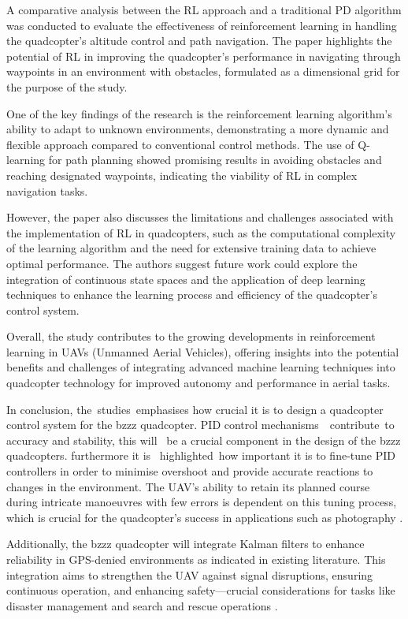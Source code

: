 \documentclass{report}
\begin{document}
A comparative analysis between the RL approach and a traditional PD algorithm
was conducted to evaluate the effectiveness of reinforcement learning in
handling the quadcopter's altitude control and path navigation. The paper
highlights the potential of RL in improving the quadcopter's performance in
navigating through waypoints in an environment with obstacles, formulated as a
dimensional grid for the purpose of the study.

One of the key findings of the research is the reinforcement learning
algorithm's ability to adapt to unknown environments, demonstrating a more
dynamic and flexible approach compared to conventional control methods. The use
of Q-learning for path planning showed promising results in avoiding obstacles
and reaching designated waypoints, indicating the viability of RL in complex
navigation tasks.

However, the paper also discusses the limitations and challenges associated with
the implementation of RL in quadcopters, such as the computational complexity of
the learning algorithm and the need for extensive training data to achieve
optimal performance. The authors suggest future work could explore the
integration of continuous state spaces and the application of deep learning
techniques to enhance the learning process and efficiency of the quadcopter's
control system.

Overall, the study contributes to the growing developments in reinforcement
learning in UAVs (Unmanned Aerial Vehicles), offering insights into the
potential benefits and challenges of integrating advanced machine learning
techniques into quadcopter technology for improved autonomy and performance in
aerial tasks.

In conclusion, the studies emphasises how crucial it is to design a quadcopter
control system for the bzzz quadcopter. PID control mechanisms  contribute to
accuracy and stability, this will  be a crucial component in the design of the
bzzz quadcopters. furthermore it is  highlighted how important it is to
fine-tune PID controllers in order to minimise overshoot and provide accurate
reactions to changes in the environment. The UAV's ability to retain its planned
course during intricate manoeuvres with few errors is dependent on this tuning
process, which is crucial for the quadcopter's success in applications such as
photography \cite{photographyAndVideo}.

Additionally, the bzzz quadcopter will integrate Kalman filters to enhance
reliability in GPS-denied environments as indicated in existing literature. This
integration aims to strengthen the UAV against signal disruptions, ensuring
continuous operation, and enhancing safety—crucial considerations for tasks like
disaster management \cite{disasterManagement} and search and rescue operations
\cite{searchAndRescue}.
\end{document}
